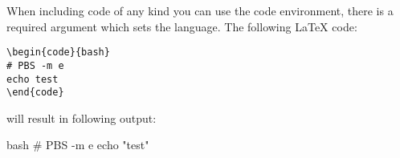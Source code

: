 \documentclass[11pt,a4paper,oneside]{book}
\begin{document}
When including code of any kind you can use the code environment, there is a
required argument which sets the language. The following LaTeX code:

\begin{verbatim}
\begin{code}{bash}
# PBS -m e
echo test
\end{code}
\end{verbatim}

will result in following output:

\begin{code}{bash}
# PBS -m e
echo "test"
\end{code}
\end{document}
